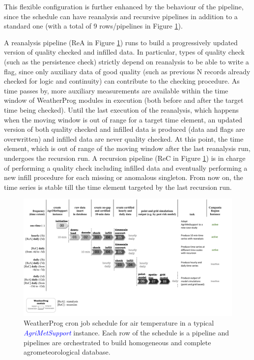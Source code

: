 \documentclass[authoryear,preprint,review,12pt]{elsarticle}
\newcommand{\update}[1]{\emph{\textcolor{blue}{#1}}}
\newcommand{\gci}{\update{AgriMetSupport}\xspace}
\begin{document}
This flexible configuration is further enhanced by the behaviour of the pipeline, since the schedule can have reanalysis and recursive pipelines in addition to a standard one (with a total of 9 rows/pipelines in Figure \ref{Fig:weatherprog:calls}).

A reanalysis pipeline (ReA in Figure \ref{Fig:weatherprog:calls}) runs to build a progressively updated version of quality checked and infilled data.
In particular, types of quality check (such as the persistence check) strictly depend on reanalysis to be able to write a flag, since only auxiliary data of good quality (such as previous N records already checked for logic and continuity) can contribute to the checking procedure.
As time passes by, more auxiliary measurements are available within the time window of WeatherProg modules in execution (both before and after the target time being checked). 
Until the last execution of the reanalysis, which happens when the moving window is out of range for a target time element, an updated version of both quality checked and infilled data is produced (data and flags are overwritten) and infilled data are never quality checked.
At this point, the time element, which is out of range of the moving window after the last reanalysis run, undergoes the recursion run.
A recursion pipeline (ReC in Figure \ref{Fig:weatherprog:calls}) is in charge of performing a quality check including infilled data and eventually performing a new infill procedure for each missing or anomalous singleton.
From now on, the time series is stable till the time element targeted by the last recursion run.

\begin{figure}
	\centering
	\includegraphics[scale=.4]{figures/WeatherProg-schedule-fig.pdf}
	\caption{WeatherProg cron job schedule for air temperature in a typical \gci instance. Each row of the schedule is a pipeline and pipelines are orchestrated to build homogeneous and complete agrometeorological database.}
	\label{Fig:weatherprog:calls}
\end{figure}
\end{document}
